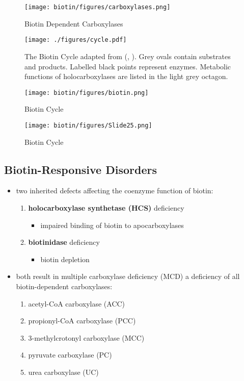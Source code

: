 \documentclass[12pt]{scrartcl}
\begin{document}
\begin{figure}[htbp]
\centering
\texttt{[image: biotin/figures/carboxylases.png]}
\caption{\label{fig:org6e7919f}Biotin Dependent Carboxylases}
\end{figure}

\begin{figure}[htbp]
\centering
\texttt{[image: ./figures/cycle.pdf]}
\caption{\label{fig:orgb8ab5d2}The Biotin Cycle adapted from (, ). Grey ovals contain substrates and products. Labelled black points represent enzymes. Metabolic functions of holocarboxylases are listed in the light grey octagon.}
\end{figure}

\begin{figure}[htbp]
\centering
\texttt{[image: biotin/figures/biotin.png]}
\caption{\label{fig:org5760f7e}Biotin Cycle}
\end{figure}

\begin{figure}[htbp]
\centering
\texttt{[image: biotin/figures/Slide25.png]}
\caption{\label{fig:orgbf75d3c}Biotin Cycle}
\end{figure}

\subsection{Biotin-Responsive Disorders}
\label{sec:org0db6e9b}
\begin{itemize}
\item two inherited defects affecting the coenzyme function of biotin:
\begin{enumerate}
\item \textbf{holocarboxylase synthetase (HCS)} deficiency
\begin{itemize}
\item impaired binding of biotin to apocarboxylases
\end{itemize}
\item \textbf{biotinidase} deficiency
\begin{itemize}
\item biotin depletion
\end{itemize}
\end{enumerate}

\item both result in multiple carboxylase deficiency (MCD) a deficiency of
all biotin-dependent carboxylases:
\begin{enumerate}
\item acetyl-CoA carboxylase (ACC)
\item propionyl-CoA carboxylase (PCC)
\item 3-methylcrotonyl carboxylase (MCC)
\item pyruvate carboxylase (PC)
\item urea carboxylase (UC)
\end{enumerate}
\end{itemize}
\end{document}
